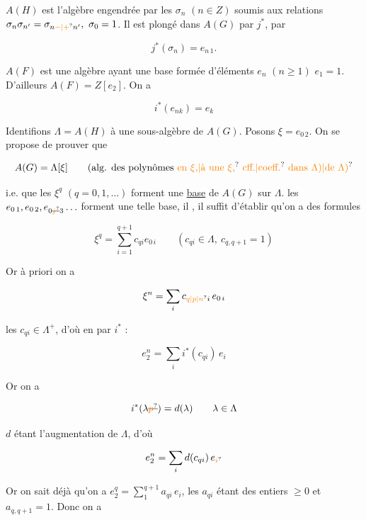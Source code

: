 
$A(H)$ est l'algèbre  engendrée par les $\sigma_n$ $(n\in Z)$ soumis aux relations $\sigma_n\sigma_{n'}=\sigma_{n\unsure{-|+}n'},\ \sigma_0=1$. Il est plongé dans $A(G)$ par $j^*$, par

\[ j^*(\sigma_n)=e_{n\,1}. \]

$A(F)$ est  une algèbre ayant une base formée d'éléments $e_n$ $(n\geq1)$  $e_1=1$. D'ailleurs $A(F)=Z[e_2]$. On a

\[ i^*(e_{nk})=e_k \]

Identifions $\Lambda=A(H)$ à une sous-algèbre de $A(G)$. Posons $\xi=e_{0\,2}$. On se propose de prouver que

\[ A(G)=\Lambda[\xi]\qquad\text{(alg. des polynômes \unsure{en $\xi$,|à une $\xi$,} \unsure{cff.|coeff.} \unsure{dans $\Lambda$)|de $\Lambda$)}} \]

i.e. que les $\xi^q$ $(q=0,1,\ldots)$ forment une \uline{base} de $A(G)$ sur $\Lambda$.  les $e_{0\,1},e_{0\,2},e_{0\deleted{\unsure{j}}3}\ldots$ forment une telle base, il , il suffit d'établir qu'on a des formules

\[ \xi^q=\sum_{i=1}^{q+1}c_{qi}e_{0\,i}\qquad(c_{qi}\in\Lambda,\ c_{q,q+1}=1)\tag*{(1)} \]



Or à priori on a

\[ \xi^{n}=\sum_i c_{\unsure{q|p|n}i}\,e_{0\,i} \]

les $c_{qi}\in\Lambda^+$, d'où en  par $i^*$ :

\[ e_2^n=\sum_i i^*(c_{qi})\,e_i \]


Or on a

\[ i^*(\lambda\deleted{\unsure{p}})=d(\lambda)\qquad\lambda\in\Lambda \]

$d$ étant l'augmentation de $\Lambda$, d'où

\[ e_2^n=\sum_i d(c_{qi})\,e_{\unsure{i}} \]

Or on sait déjà qu'on a $e_2^q=\sum_1^{q+1}a_{qi}\,e_i$, les $a_{qi}$ étant des entiers $\geq0$ et  $a_{q,q+1}=1$. Donc on a

